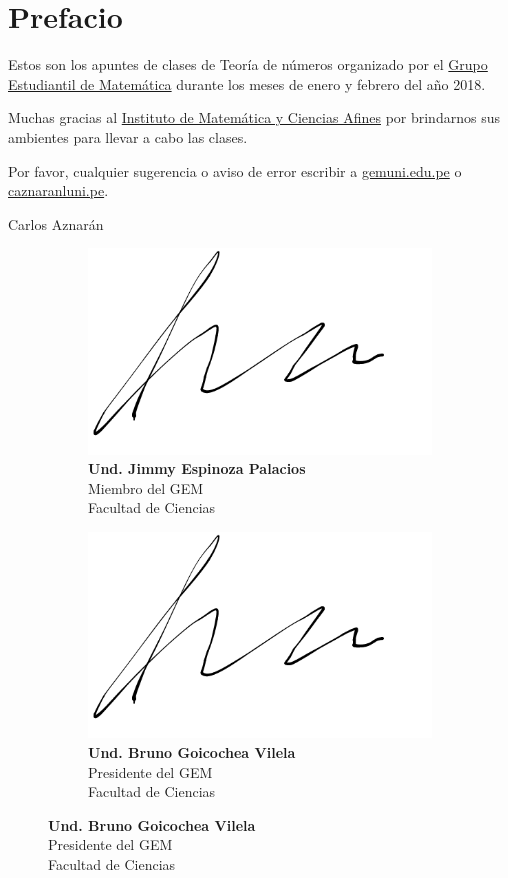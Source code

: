 \chapter*{Prefacio}

Estos son los apuntes de clases de Teoría de números organizado por el \href{https://web.facebook.com/GEMFCUNI/}{Grupo Estudiantil de Matemática} durante los meses de enero y febrero del año 2018.

Muchas gracias al \href{http://imca.edu.pe/portal/index.php/es/}{Instituto de Matemática y Ciencias Afines} por brindarnos sus ambientes para llevar a cabo las clases.

Por favor, cualquier sugerencia o aviso de error escribir a {\href{mailto:gem@uni.edu.pe}{gem\MVAt uni.edu.pe}} o {\href{mailto:caznaranl@uni.pe}{caznaranl\MVAt uni.pe}}.

\begin{flushright}
	Carlos Aznarán
	
\end{flushright}

\begin{figure}[h]
	\begin{subfigure}[b]{.5\textwidth}
		\centering
		\captionsetup{justification=centering,margin=0.5cm}
		\includegraphics[height=4\baselineskip,width=.4\linewidth]{signature.png}
		\caption*{\textbf{Und. Jimmy Espinoza Palacios}\\Miembro del GEM\\Facultad de Ciencias}
	\end{subfigure}
	\begin{subfigure}[b]{.5\textwidth}
		\centering
		\captionsetup{justification=centering,margin=0.5cm}
		\includegraphics[height=4\baselineskip,width=.4\linewidth]{signature.png}
		\caption*{\textbf{Und. Bruno Goicochea Vilela}\\Presidente del GEM\\Facultad de Ciencias}
	\end{subfigure}
\end{figure}%
